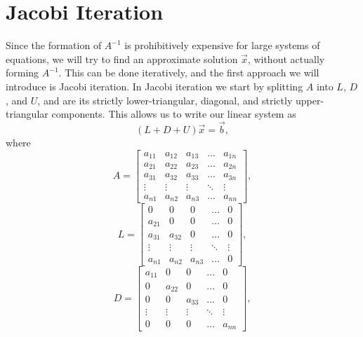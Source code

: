 \section{Jacobi Iteration}
Since the formation of $A^{-1}$ is prohibitively expensive for large systems of equations, we will try to find an approximate solution $\vec{x}$, without actually forming $A^{-1}$. This can be done iteratively, and the first approach we will introduce is Jacobi iteration. In Jacobi iteration we start by splitting $A$ into $L$, $D$, and $U$, and are its strictly lower-triangular, diagonal, and strictly upper-triangular components. This allows us to write our linear system as
\begin{equation}
	(L+D+U) \vec{x} = \vec{b},
\end{equation}
where
\begin{equation}
	A = 
	\begin{bmatrix}
	    a_{11} & a_{12} & a_{13} & \dots  & a_{1n} \\
	    a_{21} & a_{22} & a_{23} & \dots  & a_{2n} \\
			a_{31} & a_{32} & a_{33} & \dots  & a_{3n} \\
	    \vdots & \vdots & \vdots & \ddots & \vdots \\
	    a_{n1} & a_{n2} & a_{n3} & \dots  & a_{nn}
	\end{bmatrix},
\end{equation}
\begin{equation}
	L = 
	\begin{bmatrix}
	    0 & 0 & 0 & \dots  & 0 \\
	    a_{21} & 0 & 0 & \dots  & 0 \\
			a_{31} & a_{32} & 0 & \dots  & 0 \\
	    \vdots & \vdots & \vdots & \ddots & \vdots \\
	    a_{n1} & a_{n2} & a_{n3} & \dots  & 0
	\end{bmatrix},
\end{equation}
\begin{equation}
	D = 
	\begin{bmatrix}
	    a_{11} & 0 & 0 & \dots  & 0 \\
	    0 & a_{22} & 0 & \dots  & 0 \\
			0 & 0 & a_{33} & \dots  & 0 \\
	    \vdots & \vdots & \vdots & \ddots & \vdots \\
	    0 & 0 & 0 & \dots  & a_{nn}
	\end{bmatrix},
\end{equation}
